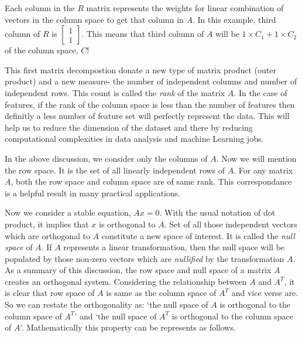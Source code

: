 \documentclass[
  letterpaper,
  DIV=11,
  numbers=noendperiod]{scrreprt}
\theoremstyle{plain}
\theoremstyle{definition}
\theoremstyle{remark}
\begin{document}
\begin{tcolorbox}[enhanced jigsaw, leftrule=.75mm, bottomtitle=1mm, colback=white, toptitle=1mm, opacitybacktitle=0.6, toprule=.15mm, colbacktitle=quarto-callout-important-color!10!white, arc=.35mm, colframe=quarto-callout-important-color-frame, title=\textcolor{quarto-callout-important-color}{\faExclamation}\hspace{0.5em}{Interpretation of the \(R\) matrix}, titlerule=0mm, rightrule=.15mm, left=2mm, bottomrule=.15mm, breakable, coltitle=black, opacityback=0]

Each column in the \(R\) matrix represents the weights for linear
combination of vectors in the column space to get that column in \(A\).
In this example, third column of \(R\) is
\(\begin{bmatrix}1\\1\end{bmatrix}\). This means that third column of
\(A\) will be \(1\times C_1+1\times C_2\) of the column space, \(C\)!

\end{tcolorbox}

This first matrix decompostion donate a new type of matrix product
(outer product) and a new measure- the number of independent columns and
number of independent rows. This count is called the \emph{rank} of the
matrix \(A\). In the case of features, if the rank of the column space
is less than the number of features then definitly a less number of
feature set will perfectly represent the data. This will help us to
reduce the dimension of the dataset and there by reducing computational
complexities in data analysis and machine Learning jobs.

In the above discussion, we consider only the columns of \(A\). Now we
will mention the row space. It is the set of all linearly independent
rows of \(A\). For any matrix \(A\), both the row space and column space
are of same rank. This correspondance is a helpful result in many
practical applications.

Now we consider a stable equation, \(Ax=0\). With the usual notation of
dot product, it implies that \(x\) is orthogonal to \(A\). Set of all
those independent vectors which are orthogonal to \(A\) constitute a new
space of interest. It is called the \emph{null space} of \(A\). If \(A\)
represents a linear transformation, then the null space will be
populated by those non-zero vectors which are \emph{nullified} by the
transformation \(A\). As a summary of this discussion, the row space and
null space of a matrix \(A\) creates an orthogonal system. Considering
the relationship between \(A\) and \(A^T\), it is clear that row space
of \(A\) is same as the column space of \(A^T\) and vice verse are. So
we can restate the orthogonality as: `the null space of \(A\) is
orthogonal to the column space of \(A^T\)' and `the null space of
\(A^T\) is orthogonal to the column space of \(A\)'. Mathematically this
property can be represents as follows.
\end{document}
